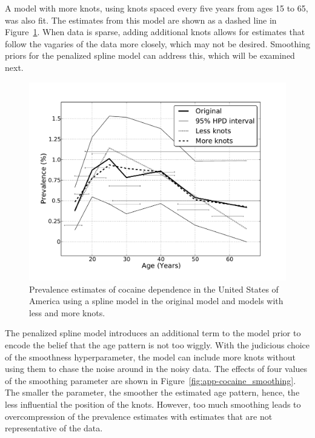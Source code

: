 A model with more knots, using knots spaced every five years from
ages 15 to 65, was also fit.
The estimates from this model are shown as a dashed line in
Figure~\ref{fig:app-cocaine_knots}.  When data is sparse, adding
additional knots allows for estimates that follow the vagaries of the
data more closely, which may not be desired.  Smoothing priors for the
penalized spline model can address this, which will be examined next.

    \begin{figure}[h]
        \begin{center}
            \includegraphics[width=\textwidth]{applications/cocaine_dependence-knots.pdf}
            \caption{Prevalence estimates of cocaine dependence in the United
              States of America using a spline model in the original
              model and models with less and more knots. }
        \label{fig:app-cocaine_knots}
        \end{center}
    \end{figure}

The penalized spline model introduces an additional term to the model
prior to encode the belief that the age pattern is not too wiggly.
With the judicious choice of the smoothness hyperparameter, the model
can include more knots without using them to chase the noise around in
the noisy data.  The effects of four values of the smoothing parameter
are shown in Figure~\ref{fig:app-cocaine_smoothing}.  The smaller the
parameter, the smoother the estimated age pattern, hence, the less
influential the position of the knots.  However, too much smoothing
leads to overcompression of the prevalence estimates with estimates
that are not representative of the data.

